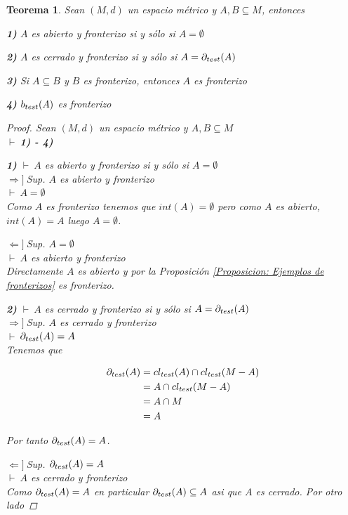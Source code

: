 \documentclass[oneside]{book} %
\theoremstyle{Teorema}
\newtheorem{Teorema}[Definicion]{Teorema}
\theoremstyle{Ejemplos}
\theoremstyle{[Obs]}
\def \test {test}
\newcommand{\cerradura}[2][\test]{\ifx \test #1 {\overline{#2}} \else {cl_{#1}(#2)} \fi} %
\newcommand{\frontera}[2][\test]{\ifx \test #1 {\partial(#2)} \else {\partial_{#1}(#2)} \fi} %
\newcommand{\borde}[2][\test]{\ifx \test #1 {b(#2)} \else {b_{#1}(#2)} \fi} %
\renewcommand{\{}{\left\lbrace} %
\renewcommand{\}}{\right\rbrace} %
\newcommand{\n}{\cap} %
\renewcommand{\sc}{\subseteq} %
\newcommand{\pd}{$\vdash\ $} %
\newcommand{\necesidad}{$\Rightarrow]\ $} %
\newcommand{\suficiencia}{$\Leftarrow]\ $} %
\begin{document}
			\begin{Teorema}\setlength{\parindent}{0em}
			
				Sean $(M, d)$ un espacio métrico y $A, B \sc M$, entonces 

				\textbf{1)} $A$ es abierto y fronterizo si y sólo si $A = \emptyset$

				\textbf{2)} $A$ es cerrado y fronterizo si y sólo si $A = \frontera{A}$

				\textbf{3)} Si $A \sc B$ y $B$ es fronterizo, entonces $A$ es fronterizo 

				\textbf{4)} $\borde{A}$ es fronterizo 

				\begin{proof}
					
					Sean $(M, d)$ un espacio métrico y $A, B \sc M$ \\ 
					\pd \textbf{1) - 4)} 

					\textbf{1)} \pd $A$ es abierto y fronterizo si y sólo si $A = \emptyset$ \\ 
					\necesidad Sup. $A$ es abierto y fronterizo \\ 
					\pd $A = \emptyset$ \\ 
					Como $A$ es fronterizo tenemos que $int(A) = \emptyset$ pero como $A$ es abierto, $int(A) = A$ luego $A = \emptyset$. 

					\suficiencia Sup. $A = \emptyset$ \\ 
					\pd $A$ es abierto y fronterizo \\ 
					Directamente $A$ es abierto y por la Proposición \ref{Proposicion: Ejemplos de fronterizos} es fronterizo.

					\textbf{2)} \pd $A$ es cerrado y fronterizo si y sólo si $A = \frontera{A}$ \\
					\necesidad Sup. $A$ es cerrado y fronterizo \\ 
					\pd $\frontera{A} = A$ \\ 
					Tenemos que 

					\begin{align*}
						\frontera{A} &= \cerradura{A} \n \cerradura{M - A} \\ 
						&= A \n \cerradura{M - A} \\ 
						&= A \n M \\ 
						&= A
					\end{align*}

					Por tanto $\frontera{A} = A$.

					\suficiencia Sup. $\frontera{A} = A$ \\ 
					\pd $A$ es cerrado y fronterizo \\ 
					Como $\frontera{A} = A$ en particular $\frontera{A} \sc A$ asi que $A$ es cerrado. Por otro lado


\end{proof}
\end{Teorema}
\end{document}
